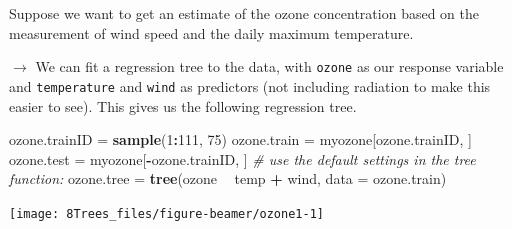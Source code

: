 \documentclass[10pt,ignorenonframetext,]{beamer}
\newenvironment{Shaded}{\begin{snugshade}}{\end{snugshade}}
\newcommand{\KeywordTok}[1]{\textcolor[rgb]{0.13,0.29,0.53}{\textbf{#1}}}
\newcommand{\DataTypeTok}[1]{\textcolor[rgb]{0.13,0.29,0.53}{#1}}
\newcommand{\DecValTok}[1]{\textcolor[rgb]{0.00,0.00,0.81}{#1}}
\newcommand{\StringTok}[1]{\textcolor[rgb]{0.31,0.60,0.02}{#1}}
\newcommand{\CommentTok}[1]{\textcolor[rgb]{0.56,0.35,0.01}{\textit{#1}}}
\newcommand{\OperatorTok}[1]{\textcolor[rgb]{0.81,0.36,0.00}{\textbf{#1}}}
\newcommand{\NormalTok}[1]{#1}
\begin{document}
\begin{frame}[fragile]

Suppose we want to get an estimate of the ozone concentration based on
the measurement of wind speed and the daily maximum temperature.

\(\rightarrow\) We can fit a regression tree to the data, with
\texttt{ozone} as our response variable and \texttt{temperature} and
\texttt{wind} as predictors (not including radiation to make this easier
to see). This gives us the following regression tree.

\end{frame}

\begin{frame}[fragile]

\footnotesize

\begin{Shaded}
\begin{Highlighting}[]
\NormalTok{ozone.trainID =}\StringTok{ }\KeywordTok{sample}\NormalTok{(}\DecValTok{1}\OperatorTok{:}\DecValTok{111}\NormalTok{, }\DecValTok{75}\NormalTok{)}
\NormalTok{ozone.train =}\StringTok{ }\NormalTok{myozone[ozone.trainID, ]}
\NormalTok{ozone.test =}\StringTok{ }\NormalTok{myozone[}\OperatorTok{-}\NormalTok{ozone.trainID, ]}
\CommentTok{# use the default settings in the tree function:}
\NormalTok{ozone.tree =}\StringTok{ }\KeywordTok{tree}\NormalTok{(ozone }\OperatorTok{~}\StringTok{ }\NormalTok{temp }\OperatorTok{+}\StringTok{ }\NormalTok{wind, }\DataTypeTok{data =}\NormalTok{ ozone.train)}
\end{Highlighting}
\end{Shaded}

\begin{center}\texttt{[image: 8Trees\_files/figure-beamer/ozone1-1]} \end{center}

\end{frame}
\end{document}
